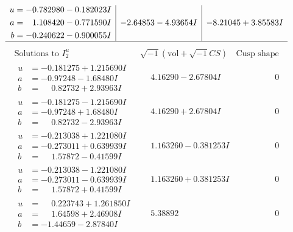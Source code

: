\documentclass[1p]{elsarticle_modified}
\theoremstyle{definition}
\newcommand{\I}{\sqrt{-1}}
\begin{document}
$$\begin{array}{c|c|c}
\begin{aligned}
u &= -0.782980 - 0.182023 I \\
a &= \phantom{-}1.108420 - 0.771590 I \\
b &= -0.240622 - 0.900055 I\end{aligned}
 & -2.64853 - 4.93654 I & -8.21045 + 3.85583 I\\
 \hline 
 \end{array}$$\newpage$$\begin{array}{c|c|c}  
\text{Solutions to }I^u_{2}& \I (\text{vol} + \sqrt{-1}CS) & \text{Cusp shape}\\
 \hline 
\begin{aligned}
u &= -0.181275 + 1.215690 I \\
a &= -0.97248 - 1.68480 I \\
b &= \phantom{-}0.82732 + 2.93963 I\end{aligned}
 & \phantom{-}4.16290 - 2.67804 I & \phantom{-0.000000 } 0 \\ \hline\begin{aligned}
u &= -0.181275 - 1.215690 I \\
a &= -0.97248 + 1.68480 I \\
b &= \phantom{-}0.82732 - 2.93963 I\end{aligned}
 & \phantom{-}4.16290 + 2.67804 I & \phantom{-0.000000 } 0 \\ \hline\begin{aligned}
u &= -0.213038 + 1.221080 I \\
a &= -0.273011 + 0.639939 I \\
b &= \phantom{-}1.57872 - 0.41599 I\end{aligned}
 & \phantom{-}1.163260 - 0.381253 I & \phantom{-0.000000 } 0 \\ \hline\begin{aligned}
u &= -0.213038 - 1.221080 I \\
a &= -0.273011 - 0.639939 I \\
b &= \phantom{-}1.57872 + 0.41599 I\end{aligned}
 & \phantom{-}1.163260 + 0.381253 I & \phantom{-0.000000 } 0 \\ \hline\begin{aligned}
u &= \phantom{-}0.223743 + 1.261850 I \\
a &= \phantom{-}1.64598 + 2.46908 I \\
b &= -1.44659 - 2.87840 I\end{aligned}
 & \phantom{-}5.38892\phantom{ +0.000000I} & \phantom{-0.000000 } 0 \\ \hline\begin{aligned}

\end{aligned}
\end{array}$$
\end{document}

